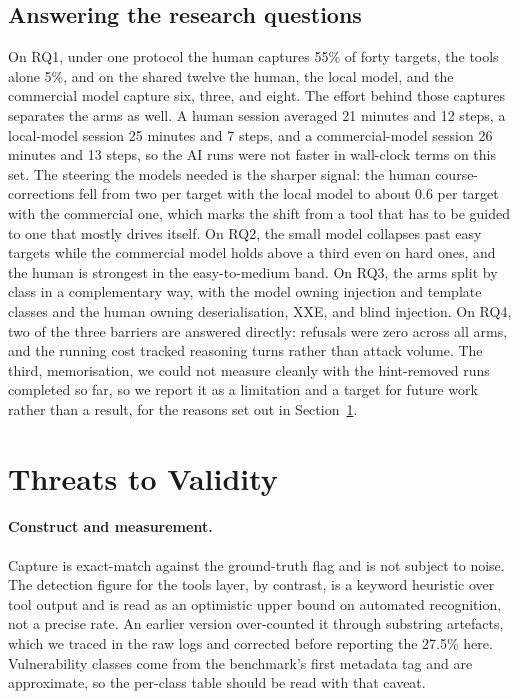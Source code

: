 \documentclass[11pt]{article}
\begin{document}
\subsection{Answering the research questions}
On RQ1, under one protocol the human captures 55\% of forty targets, the tools alone 5\%, and on the shared twelve the human, the local model, and the commercial model capture six, three, and eight. The effort behind those captures separates the arms as well. A human session averaged 21 minutes and 12 steps, a local-model session 25 minutes and 7 steps, and a commercial-model session 26 minutes and 13 steps, so the AI runs were not faster in wall-clock terms on this set. The steering the models needed is the sharper signal: the human course-corrections fell from two per target with the local model to about 0.6 per target with the commercial one, which marks the shift from a tool that has to be guided to one that mostly drives itself. On RQ2, the small model collapses past easy targets while the commercial model holds above a third even on hard ones, and the human is strongest in the easy-to-medium band. On RQ3, the arms split by class in a complementary way, with the model owning injection and template classes and the human owning deserialisation, XXE, and blind injection. On RQ4, two of the three barriers are answered directly: refusals were zero across all arms, and the running cost tracked reasoning turns rather than attack volume. The third, memorisation, we could not measure cleanly with the hint-removed runs completed so far, so we report it as a limitation and a target for future work rather than a result, for the reasons set out in Section~\ref{sec:threats}.

\section{Threats to Validity}
\label{sec:threats}

\paragraph{Construct and measurement.}
Capture is exact-match against the ground-truth flag and is not subject to noise. The detection figure for the tools layer, by contrast, is a keyword heuristic over tool output and is read as an optimistic upper bound on automated recognition, not a precise rate. An earlier version over-counted it through substring artefacts, which we traced in the raw logs and corrected before reporting the 27.5\% here. Vulnerability classes come from the benchmark's first metadata tag and are approximate, so the per-class table should be read with that caveat.
\end{document}
